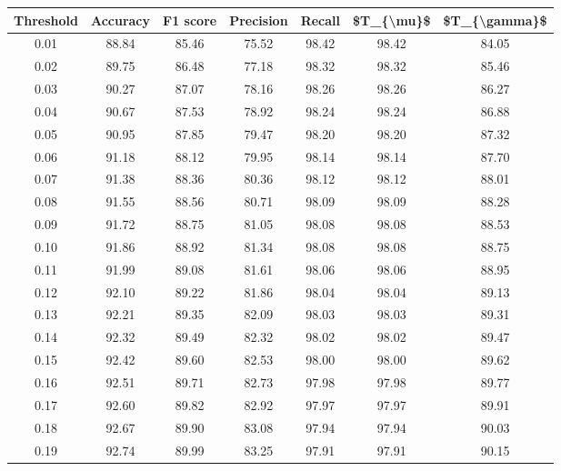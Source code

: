 \begin{tabular}{|c|c|c|c|c|c|c|}
\hline
 Threshold &  Accuracy &  F1 score &  Precision &  Recall &  \$T\_\{\textbackslash mu\}\$ &  \$T\_\{\textbackslash gamma\}\$ \\
\hline
      0.01 &     88.84 &     85.46 &      75.52 &   98.42 &      98.42 &         84.05 \\
      0.02 &     89.75 &     86.48 &      77.18 &   98.32 &      98.32 &         85.46 \\
      0.03 &     90.27 &     87.07 &      78.16 &   98.26 &      98.26 &         86.27 \\
      0.04 &     90.67 &     87.53 &      78.92 &   98.24 &      98.24 &         86.88 \\
      0.05 &     90.95 &     87.85 &      79.47 &   98.20 &      98.20 &         87.32 \\
      0.06 &     91.18 &     88.12 &      79.95 &   98.14 &      98.14 &         87.70 \\
      0.07 &     91.38 &     88.36 &      80.36 &   98.12 &      98.12 &         88.01 \\
      0.08 &     91.55 &     88.56 &      80.71 &   98.09 &      98.09 &         88.28 \\
      0.09 &     91.72 &     88.75 &      81.05 &   98.08 &      98.08 &         88.53 \\
      0.10 &     91.86 &     88.92 &      81.34 &   98.08 &      98.08 &         88.75 \\
      0.11 &     91.99 &     89.08 &      81.61 &   98.06 &      98.06 &         88.95 \\
      0.12 &     92.10 &     89.22 &      81.86 &   98.04 &      98.04 &         89.13 \\
      0.13 &     92.21 &     89.35 &      82.09 &   98.03 &      98.03 &         89.31 \\
      0.14 &     92.32 &     89.49 &      82.32 &   98.02 &      98.02 &         89.47 \\
      0.15 &     92.42 &     89.60 &      82.53 &   98.00 &      98.00 &         89.62 \\
      0.16 &     92.51 &     89.71 &      82.73 &   97.98 &      97.98 &         89.77 \\
      0.17 &     92.60 &     89.82 &      82.92 &   97.97 &      97.97 &         89.91 \\
      0.18 &     92.67 &     89.90 &      83.08 &   97.94 &      97.94 &         90.03 \\
      0.19 &     92.74 &     89.99 &      83.25 &   97.91 &      97.91 &         90.15 \\

\end{tabular}
